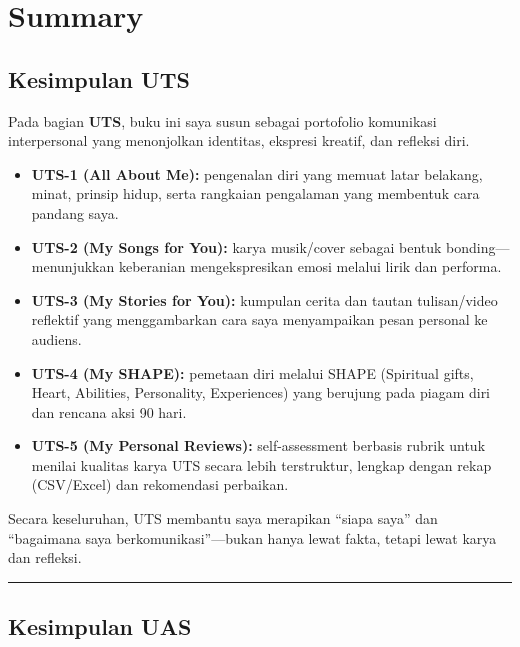 \documentclass[
  letterpaper,
  DIV=11,
  numbers=noendperiod]{scrreprt}
\providecommand{\tightlist}{%
  \setlength{\itemsep}{0pt}\setlength{\parskip}{0pt}}
\begin{document}

\chapter{Summary}\label{summary}

\section{Kesimpulan UTS}\label{kesimpulan-uts}

Pada bagian \textbf{UTS}, buku ini saya susun sebagai portofolio
komunikasi interpersonal yang menonjolkan identitas, ekspresi kreatif,
dan refleksi diri.

\begin{itemize}
\tightlist
\item
  \textbf{UTS-1 (All About Me):} pengenalan diri yang memuat latar
  belakang, minat, prinsip hidup, serta rangkaian pengalaman yang
  membentuk cara pandang saya.
\item
  \textbf{UTS-2 (My Songs for You):} karya musik/cover sebagai bentuk
  bonding---menunjukkan keberanian mengekspresikan emosi melalui lirik
  dan performa.
\item
  \textbf{UTS-3 (My Stories for You):} kumpulan cerita dan tautan
  tulisan/video reflektif yang menggambarkan cara saya menyampaikan
  pesan personal ke audiens.
\item
  \textbf{UTS-4 (My SHAPE):} pemetaan diri melalui SHAPE (Spiritual
  gifts, Heart, Abilities, Personality, Experiences) yang berujung pada
  piagam diri dan rencana aksi 90 hari.
\item
  \textbf{UTS-5 (My Personal Reviews):} self-assessment berbasis rubrik
  untuk menilai kualitas karya UTS secara lebih terstruktur, lengkap
  dengan rekap (CSV/Excel) dan rekomendasi perbaikan.
\end{itemize}

Secara keseluruhan, UTS membantu saya merapikan ``siapa saya'' dan
``bagaimana saya berkomunikasi''---bukan hanya lewat fakta, tetapi lewat
karya dan refleksi.

\begin{center}\rule{0.5\linewidth}{0.5pt}\end{center}

\section{Kesimpulan UAS}\label{kesimpulan-uas}
\end{document}

